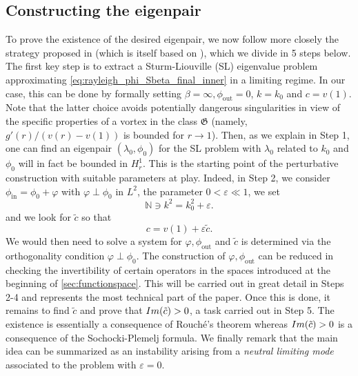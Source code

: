 \documentclass[11pt,reqno]{amsproc}
\def\eps{\varepsilon}
\def\Im{{\rm Im}}
\theoremstyle{definition}
\theoremstyle{definition}
\numberwithin{equation}{section}
\begin{document}
\subsection{Constructing the eigenpair}
\label{sec:construction}
To prove the existence of the desired eigenpair, we now follow more closely the strategy proposed in \cite{kumar2023simple} (which is itself based on \cite{vishik_notes,albritton2023linear,lin2003instability}), which we divide in 5 steps below. The first key step is to extract a Sturm-Liouville (SL) eigenvalue problem  approximating \cref{eq:rayleigh_phi_Sbeta_final_inner} in a limiting regime. In our case, this can be done by formally setting $\beta=\infty, \phi_{\mathrm{out}}=0$, $k=k_0$ and $c=v(1)$. Note that the latter choice avoids potentially dangerous singularities in view of the specific properties of a vortex in the class $\mathfrak{G}$ (namely, $g'(r)/(v(r)-v(1))$ is bounded for $r\to1$). Then, as we explain in Step 1, one can find an eigenpair $(\lambda_0,\phi_0)$ for the SL problem with $\lambda_0$ related to $k_0$ and $\phi_0$ will in fact be bounded in $H^1_r$. This is the starting point of the perturbative construction with suitable parameters at play. Indeed, in Step 2, we consider  $\phi_{\mathrm{in}}=\phi_0+\varphi$ with $\varphi\perp \phi_0$ in $L^2$, the parameter $0<\eps\ll1$, we set 
\begin{equation}
\label{def:k}
\mathbb{N} \ni k^2=k_0^2+\eps.
\end{equation}
and we look for $\tilde{c}$ so that
\begin{equation}
\label{def:c_with_eps}
c=v(1)+\eps \tilde{c}.
\end{equation}
We would then need to solve a system for $\varphi,\phi_{\mathrm{out}}$ and $\tilde{c}$ is determined via the orthogonality condition $\varphi \perp \phi_0$. The construction of $\varphi,\phi_{\mathrm{out}}$  can be reduced in checking the invertibility of certain operators in the spaces introduced at the beginning of \cref{sec:functionspace}. This will be carried out in great detail in Steps 2-4 and represents the most technical part of the paper. Once this is done, it remains to find $\tilde{c}$ and prove that $\Im(\tilde{c})>0$, a task carried out in Step 5. The existence is essentially a consequence of Rouché's theorem whereas $\Im(\tilde{c})>0$ is a consequence of the Sochocki-Plemelj formula.
We finally remark that the main idea can be summarized as an instability arising from a \textit{neutral limiting mode} associated to the problem with $\eps=0$. 
\end{document}
